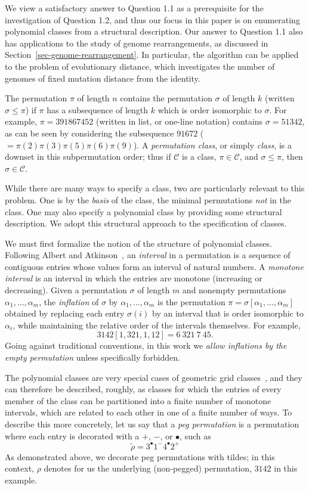 \documentclass[10pt]{article}
\theoremstyle{plain}
\theoremstyle{definition}
\newcommand{\C}{\mathcal{C}}
\newcommand{\p}[1]{#1^+}
\newcommand{\m}[1]{#1^-}
\renewcommand{\d}[1]{#1^{\bullet}}
\begin{document}
We view a satisfactory answer to Question 1.1 as a prerequisite for the investigation of Question 1.2, and thus our focus in this paper is on enumerating polynomial classes from a structural description. Our answer to Question 1.1 also has applications to the study of genome rearrangements, as discussed in Section~\ref{sec-genome-rearrangement}. In particular, the algorithm can be applied to the problem of evolutionary distance, which investigates the number of genomes of fixed mutation distance from the identity.

The permutation $\pi$ of length $n$ contains the permutation $\sigma$ of length $k$ (written $\sigma\le\pi$) if $\pi$ has a subsequence of length $k$ which is order isomorphic to $\sigma$. For example, $\pi=391867452$ (written in list, or one-line notation) contains $\sigma=51342$, as can be seen by considering the subsequence $91672$ ($=\pi(2)\pi(3)\pi(5)\pi(6)\pi(9)$). A \emph{permutation class}, or simply \emph{class}, is a downset in this subpermutation order; thus if $\C$ is a class, $\pi\in\C$, and $\sigma\le\pi$, then $\sigma\in\C$.

While there are many ways to specify a class, two are particularly relevant to this problem. One is by the \emph{basis} of the class, the minimal permutations \emph{not} in the class. One may also specify a polynomial class by providing some structural description. We adopt this structural approach to the specification of classes.

We must first formalize the notion of the structure of polynomial classes. Following Albert and Atkinson~\cite{albert:simple-permutat:}, an \emph{interval} in a permutation is a sequence of contiguous entries whose values form an interval of natural numbers. A \emph{monotone interval} is an interval in which the entries are monotone (increasing or decreasing). Given a permutation $\sigma$ of length $m$ and nonempty permutations $\alpha_1,\dots,\alpha_m$, the \emph{inflation} of $\sigma$ by $\alpha_1,\dots,\alpha_m$ is the permutation $\pi=\sigma[\alpha_1,\dots,\alpha_m]$ obtained by replacing each entry $\sigma(i)$ by an interval that is order isomorphic to $\alpha_i$, while maintaining the relative order of the intervals themselves. For example,
\[
	3142[1,321,1,12]=6\ 321\ 7\ 45.
\]
Going against traditional conventions, in this work we \emph{allow inflations by the empty permutation} unless specifically forbidden.

The polynomial classes are very special cases of geometric grid classes~\cite{albert:geometric-grid-:}, and they can therefore be described, roughly, as classes for which the entries of every member of the class can be partitioned into a finite number of monotone intervals, which are related to each other in one of a finite number of ways. To describe this more concretely, let us say that a \emph{peg permutation} is a permutation where each entry is decorated with a $+$, $-$, or $\bullet$, such as
\[
\tilde{\rho}=\d{3}\m{1}\d{4}\p{2}
\]
As demonstrated above, we decorate peg permutations with tildes; in this context, $\rho$ denotes for us the underlying (non-pegged) permutation, $3142$ in this example.
\end{document}
